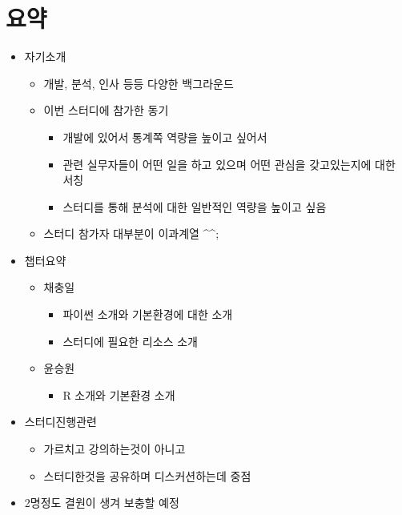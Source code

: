 \documentclass[
]{book}
\providecommand{\tightlist}{%
  \setlength{\itemsep}{0pt}\setlength{\parskip}{0pt}}
\begin{document}
\hypertarget{uxc694uxc57d}{%
\section{요약}\label{uxc694uxc57d}}

\begin{itemize}
\tightlist
\item
  자기소개

  \begin{itemize}
  \tightlist
  \item
    개발, 분석, 인사 등등 다양한 백그라운드
  \item
    이번 스터디에 참가한 동기

    \begin{itemize}
    \tightlist
    \item
      개발에 있어서 통계쪽 역량을 높이고 싶어서
    \item
      관련 실무자들이 어떤 일을 하고 있으며 어떤 관심을 갖고있는지에 대한 서칭
    \item
      스터디를 통해 분석에 대한 일반적인 역량을 높이고 싶음
    \end{itemize}
  \item
    스터디 참가자 대부분이 이과계열 \^{}\^{};
  \end{itemize}
\item
  챕터요약

  \begin{itemize}
  \tightlist
  \item
    채충일

    \begin{itemize}
    \tightlist
    \item
      파이썬 소개와 기본환경에 대한 소개
    \item
      스터디에 필요한 리소스 소개
    \end{itemize}
  \item
    윤승원

    \begin{itemize}
    \tightlist
    \item
      R 소개와 기본환경 소개
    \end{itemize}
  \end{itemize}
\item
  스터디진행관련

  \begin{itemize}
  \tightlist
  \item
    가르치고 강의하는것이 아니고
  \item
    스터디한것을 공유하며 디스커션하는데 중점
  \end{itemize}
\item
  2명정도 결원이 생겨 보충할 예정
\end{itemize}
\end{document}
